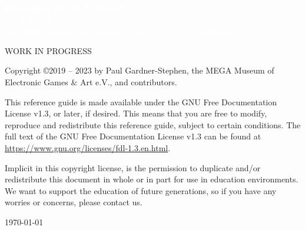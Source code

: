 





\cleardoublepage


  \begin{titlepage}
    \pagecolor{blue}
     \begin{center}
       {
         \large
         \vspace*{2cm}
               {\Huge\textcolor{white}{\bf{Developing for the MEGA65}}}\\
             \vspace{\fill}
                    {\textcolor{white}
                    {Published by \\ the MEGA Museum of Electronic Games \& Art e.V., Germany.}}
       }
     \end{center}
   \end{titlepage}

  \pagecolor{white}\textcolor{black}
  \vfill
  WORK IN PROGRESS

  Copyright \copyright 2019 -- 2023 by Paul Gardner-Stephen,
  the MEGA Museum of Electronic Games \& Art e.V.,
  and contributors.

  This reference guide is made available under the GNU Free Documentation
  License v1.3, or later, if desired. This means that you are free to
  modify, reproduce and redistribute this reference guide, subject to
  certain conditions. The full text of the GNU Free Documentation
  License v1.3 can be found at
  \url{https://www.gnu.org/licenses/fdl-1.3.en.html}.

  Implicit in this copyright license, is the permission to duplicate
  and/or redistribute this document in whole or in part for use in
  education environments. We want to support the education of future
  generations, so if you have any worries or concerns, please contact us.

   \par\today

